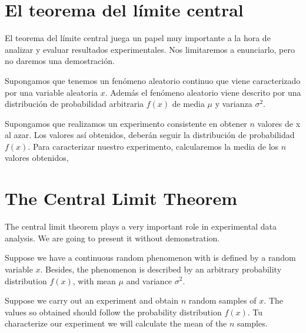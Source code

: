 \begin{paracol}{2}
\section{El teorema del límite central}\label{tlc}
El teorema del límite central juega un papel muy importante a la hora de analizar y evaluar resultados experimentales. Nos limitaremos a enunciarlo, pero no daremos una demostración.

Supongamos que tenemos un fenómeno aleatorio continuo que viene caracterizado por una variable aleatoria $x$. Además el fenómeno aleatorio viene descrito por una distribución de probabilidad arbitraria $f(x)$ de media $\mu$ y varianza $\sigma^2$.

Supongamos que realizamos un experimento consistente en obtener $n$ valores de x al azar. Los valores así obtenidos, deberán seguir la distribución de probabilidad $f(x)$. Para caracterizar nuestro experimento, calcularemos la media de los $n$ valores obtenidos,
\switchcolumn
\section{The Central Limit Theorem} 
The central limit theorem plays a very important role in experimental data analysis. We are going to present it without demonstration.

Suppose we have a continuous random phenomenon with is defined by a random variable $x$. Besides, the phenomenon is described by an arbitrary probability distribution $f(x)$, with mean $\mu$ and variance $\sigma^2$.

Suppose we carry out an experiment and obtain $n$ random samples of $x$. The values so obtained should follow the probability distribution $f(x)$. Tu characterize our experiment we will calculate the mean of the $n$ samples.    

\end{paracol}

